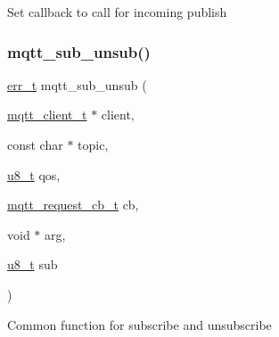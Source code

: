 Set callback to call for incoming publish \mbox{\label{openmote-cc2538_2lwip_2src_2include_2lwip_2apps_2mqtt_8h_afdb39d4a9758f98c02451aaa9a9b3103}} 
\subsubsection{\texorpdfstring{mqtt\+\_\+sub\+\_\+unsub()}{mqtt\_sub\_unsub()}}
{\footnotesize\ttfamily \hyperlink{group__infrastructure__errors_gaf02d9da80fd66b4f986d2c53d7231ddb}{err\+\_\+t} mqtt\+\_\+sub\+\_\+unsub (\begin{DoxyParamCaption}\item[{\hyperlink{structmqtt__client__t}{mqtt\+\_\+client\+\_\+t} $\ast$}]{client,  }\item[{const char $\ast$}]{topic,  }\item[{\hyperlink{group__compiler__abstraction_ga4caecabca98b43919dd11be1c0d4cd8e}{u8\+\_\+t}}]{qos,  }\item[{\hyperlink{group__mqtt_gacad2bbe2cee76eaa120cc63e2f6094fd}{mqtt\+\_\+request\+\_\+cb\+\_\+t}}]{cb,  }\item[{void $\ast$}]{arg,  }\item[{\hyperlink{group__compiler__abstraction_ga4caecabca98b43919dd11be1c0d4cd8e}{u8\+\_\+t}}]{sub }\end{DoxyParamCaption})}

Common function for subscribe and unsubscribe 